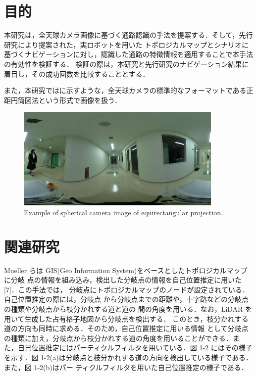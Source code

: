 \documentclass[../main]{subfiles}
\begin{document}
        \newpage

        \section{目的}
        本研究は，全天球カメラ画像に基づく通路認識の手法を提案する．そして，先行研究により提案された，実ロボットを用いた
        トポロジカルマップとシナリオに基づくナビゲーションに対し，認識した通路の特徴情報を適用することで本手法の有効性を検証する．
        検証の際は，本研究と先行研究のナビゲーション結果に着目し，その成功回数を比較することとする．


        また，本研究ではに示すような，全天球カメラの標準的なフォーマットである正距円筒図法という形式で画像を扱う．

        \begin{figure}[H]
            \centering
            \includegraphics[width=10cm]{../images/18F_aisle_exp.jpg}
            \caption{Example of spherical camera image of equirectangular projection.}
            \label{figure::image_exp}
        \end{figure}
        
        \newpage

        \section{関連研究}
        Mueller らは GIS(Geo Information System)をベースとしたトポロジカルマップに分岐
        点の情報を組み込み，検出した分岐点の情報を自己位置推定に用いた[7]．この手法では，
        分岐点にトポロジカルマップのノードが設定されている．自己位置推定の際には，分岐点
        から分岐点までの距離や，十字路などの分岐点の種類や分岐点から枝分かれする道と道の
        間の角度を用いる．なお，LiDAR を用いて生成した占有格子地図から分岐点を検出する．
        このとき，枝分かれする道の方向も同時に求める．そのため，自己位置推定に用いる情報
        として分岐点の種類に加え，分岐点から枝分かれする道の角度を用いることができる．ま
        た，自己位置推定にはパーティクルフィルタを用いている．図 1-2 にはその様子を示す．図
        1-2(a)は分岐点と枝分かれする道の方向を検出している様子である．また，図 1-2(b)はパー
        ティクルフィルタを用いた自己位置推定の様子である．
\end{document}
